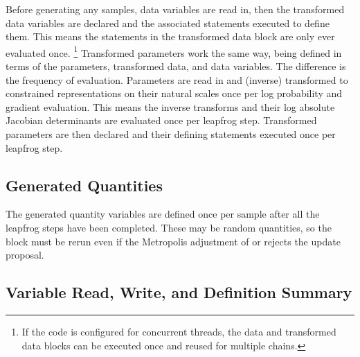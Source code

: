 Before generating any samples, data variables are read in, then the
transformed data variables are declared and the associated statements
executed to define them.  This means the statements in the transformed
data block are only ever evaluated once.%
%
\footnote{If the \Cpp code is configured for concurrent threads, the
  data and transformed data blocks can be executed once and reused for
  multiple chains.}
%
Transformed parameters work the same way, being defined in terms of
the parameters, transformed data, and data variables.  The difference
is the frequency of evaluation.  Parameters are read in and (inverse)
transformed to constrained representations on their natural scales
once per log probability and gradient evaluation.  This means the
inverse transforms and their log absolute Jacobian determinants are
evaluated once per leapfrog step.  Transformed parameters are then
declared and their defining statements executed once per leapfrog
step.

\subsection{Generated Quantities}

The generated quantity variables are defined once per sample after all
the leapfrog steps have been completed.  These may be random
quantities, so the block must be rerun even if the Metropolis
adjustment of \HMC or \NUTS rejects the update proposal.


\subsection{Variable Read, Write, and Definition Summary}

